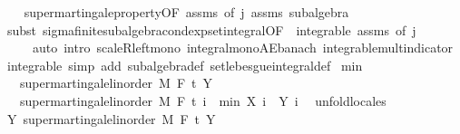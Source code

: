 \begin{isabellebody}
%
\isadelimproof
\ \ %
\endisadelimproof
%
\isatagproof
{}\isamarkupfalse%
\ supermartingale{\isacharunderscore}{\kern0pt}property{\isacharbrackleft}{\kern0pt}OF\ assms{\isacharparenleft}{\kern0pt}{}{\isacharparenright}{\kern0pt}{\isacharcomma}{\kern0pt}\ of\ j{\isacharbrackright}{\kern0pt}\ assms\ subalgebra\isanewline
\ \ \isamarkupfalse%
\ {\isacharparenleft}{\kern0pt}subst\ sigma{\isacharunderscore}{\kern0pt}finite{\isacharunderscore}{\kern0pt}subalgebra{\isachardot}{\kern0pt}cond{\isacharunderscore}{\kern0pt}exp{\isacharunderscore}{\kern0pt}set{\isacharunderscore}{\kern0pt}integral{\isacharbrackleft}{\kern0pt}OF\ {\isacharunderscore}{\kern0pt}\ integrable\ assms{\isacharparenleft}{\kern0pt}{}{\isacharparenright}{\kern0pt}{\isacharcomma}{\kern0pt}\ of\ j{\isacharbrackright}{\kern0pt}{\isacharparenright}{\kern0pt}\isanewline
\ \ \ \ \ {\isacharparenleft}{\kern0pt}auto\ intro{\isacharbang}{\kern0pt}{\isacharcolon}{\kern0pt}\ scaleR{\isacharunderscore}{\kern0pt}left{\isacharunderscore}{\kern0pt}mono\ integral{\isacharunderscore}{\kern0pt}mono{\isacharunderscore}{\kern0pt}AE{\isacharunderscore}{\kern0pt}banach\ integrable{\isacharunderscore}{\kern0pt}mult{\isacharunderscore}{\kern0pt}indicator\ integrable\ simp\ add{\isacharcolon}{\kern0pt}\ subalgebra{\isacharunderscore}{\kern0pt}def\ set{\isacharunderscore}{\kern0pt}lebesgue{\isacharunderscore}{\kern0pt}integral{\isacharunderscore}{\kern0pt}def{\isacharparenright}{\kern0pt}%
\endisatagproof
{\isafoldproof}%
%
\isadelimproof
\isanewline
%
\endisadelimproof
\isanewline
{}\isamarkupfalse%
\ min{\isacharcolon}{\kern0pt}\isanewline
\ \ \ {\isachardoublequoteopen}supermartingale{\isacharunderscore}{\kern0pt}linorder\ M\ F\ t\ Y{\isachardoublequoteclose}\isanewline
\ \ \ {\isachardoublequoteopen}supermartingale{\isacharunderscore}{\kern0pt}linorder\ M\ F\ t\ {\isacharparenleft}{\kern0pt}{\isasymlambda}i\ {\isasymxi}{\isachardot}{\kern0pt}\ min\ {\isacharparenleft}{\kern0pt}X\ i\ {\isasymxi}{\isacharparenright}{\kern0pt}\ {\isacharparenleft}{\kern0pt}Y\ i\ {\isasymxi}{\isacharparenright}{\kern0pt}{\isacharparenright}{\kern0pt}{\isachardoublequoteclose}\isanewline
%
\isadelimproof
%
\endisadelimproof
%
\isatagproof
{}\isamarkupfalse%
\ {\isacharparenleft}{\kern0pt}unfold{\isacharunderscore}{\kern0pt}locales{\isacharparenright}{\kern0pt}\isanewline
\ \ \isamarkupfalse%
\ Y{\isacharcolon}{\kern0pt}\ supermartingale{\isacharunderscore}{\kern0pt}linorder\ M\ F\ t\ Y\ \isamarkupfalse%

\end{isabellebody}
